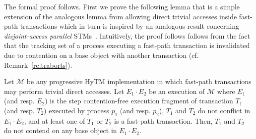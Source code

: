 The formal proof follows.
First we prove the following lemma that is a simple extension of the analogous lemma from \cite{hytm14disc}
allowing direct trivial accesses inside fast-path transactions which in turn is inspired by an analogous result concerning \emph{disjoint-access parallel} STMs~\cite{AHM09}. 
Intuitively, the proof follows follows from the fact that
the tracking set of a process executing a fast-path transaction is invalidated due to contention on a base
object with another transaction (cf. Remark~\ref{re:traborts}).
%
\begin{lemma}
	\label{lm:hytm}
	Let $\mathcal{M}$ be any progressive HyTM implementation in which fast-path transactions may perform trivial
	direct accesses.
	Let $E_1 \cdot E_2$ be an execution of $\mathcal{M}$ where
	$E_1$ (and resp. $E_2$) is the step contention-free
	execution fragment of transaction $T_1$ (and resp. $T_2$) executed by process $p_1$ (and resp. $p_2$),
	$T_1$ and $T_2$ do not conflict in $E_1 \cdot E_2$, and
	at least one of $T_1$ or $T_2$ is a fast-path transaction. 
	Then, $T_1$ and $T_2$ do not contend on any base object in $E_1 \cdot E_2$.
\end{lemma}
